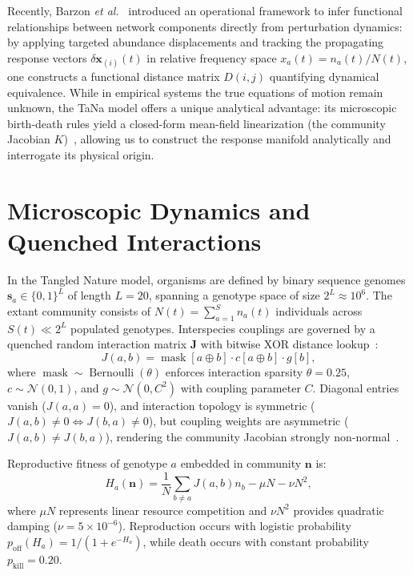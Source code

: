 Recently, Barzon \textit{et al.}~\cite{barzon2024unraveling} introduced an operational framework to infer functional relationships between network components directly from perturbation dynamics: by applying targeted abundance displacements and tracking the propagating response vectors $\delta\mathbf{x}_{(i)}(t)$ in relative frequency space $x_a(t) = n_a(t)/N(t)$, one constructs a functional distance matrix $D(i,j)$ quantifying dynamical equivalence. While in empirical systems the true equations of motion remain unknown, the TaNa model offers a unique analytical advantage: its microscopic birth-death rules yield a closed-form mean-field linearization (the community Jacobian $K$)~\cite{cairoli2014forecasting}, allowing us to construct the response manifold analytically and interrogate its physical origin.

\section{Microscopic Dynamics and Quenched Interactions}
\label{sec:t41_model}
In the Tangled Nature model, organisms are defined by binary sequence genomes $\mathbf{s}_a \in \{0,1\}^L$ of length $L = 20$, spanning a genotype space of size $2^L \approx 10^6$. The extant community consists of $N(t) = \sum_{a=1}^S n_a(t)$ individuals across $S(t) \ll 2^L$ populated genotypes. Interspecies couplings are governed by a quenched random interaction matrix $\mathbf{J}$ with bitwise XOR distance lookup~\cite{rudyarthur-tnm}:
\begin{equation}
J(a,b) = \operatorname{mask}[a \oplus b] \cdot c[a \oplus b] \cdot g[b],
\end{equation}
where $\operatorname{mask} \sim \operatorname{Bernoulli}(\theta)$ enforces interaction sparsity $\theta = 0.25$, $c \sim \mathcal{N}(0, 1)$, and $g \sim \mathcal{N}(0, C^2)$ with coupling parameter $C$. Diagonal entries vanish ($J(a,a) = 0$), and interaction topology is symmetric ($J(a,b) \neq 0 \iff J(b,a) \neq 0$), but coupling weights are asymmetric ($J(a,b) \neq J(b,a)$), rendering the community Jacobian strongly non-normal~\cite{trefethen2005spectra}.

Reproductive fitness of genotype $a$ embedded in community $\mathbf{n}$ is:
\begin{equation}
H_a(\mathbf{n}) = \frac{1}{N} \sum_{b \neq a} J(a,b) n_b - \mu N - \nu N^2,
\label{eq:t41_H}
\end{equation}
where $\mu N$ represents linear resource competition and $\nu N^2$ provides quadratic damping ($\nu = 5 \times 10^{-6}$). Reproduction occurs with logistic probability $p_{\text{off}}(H_a) = 1/(1 + e^{-H_a})$, while death occurs with constant probability $p_{\text{kill}} = 0.20$.


